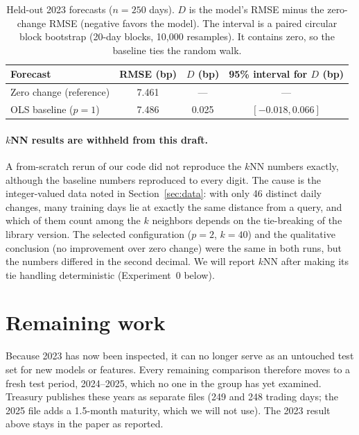 \documentclass{article}
\begin{document}
\begin{table}[t]
  \caption{Held-out 2023 forecasts ($n=250$ days). $D$ is the model's RMSE minus the zero-change RMSE (negative favors the model). The interval is a paired circular block bootstrap (20-day blocks, 10,000 resamples). It contains zero, so the baseline ties the random walk.}
  \label{tab:test}
  \centering
  \begin{tabular}{lccc}
    \toprule
    Forecast & RMSE (bp) & $D$ (bp) & 95\% interval for $D$ (bp)\\
    \midrule
    Zero change (reference) & 7.461 & --- & ---\\
    OLS baseline ($p=1$) & 7.486 & 0.025 & $[-0.018, 0.066]$\\
    \bottomrule
  \end{tabular}
\end{table}

\paragraph{$k$NN results are withheld from this draft.} A from-scratch rerun of our code did not reproduce the $k$NN numbers exactly, although the baseline numbers reproduced to every digit. The cause is the integer-valued data noted in Section~\ref{sec:data}: with only 46 distinct daily changes, many training days lie at exactly the same distance from a query, and which of them count among the $k$ neighbors depends on the tie-breaking of the library version. The selected configuration ($p=2$, $k=40$) and the qualitative conclusion (no improvement over zero change) were the same in both runs, but the numbers differed in the second decimal. We will report $k$NN after making its tie handling deterministic (Experiment~0 below).

\section{Remaining work}\label{sec:remaining}
Because 2023 has now been inspected, it can no longer serve as an untouched test set for new models or features. Every remaining comparison therefore moves to a fresh test period, 2024--2025, which no one in the group has yet examined. Treasury publishes these years as separate files (249 and 248 trading days; the 2025 file adds a 1.5-month maturity, which we will not use). The 2023 result above stays in the paper as reported.
\end{document}
